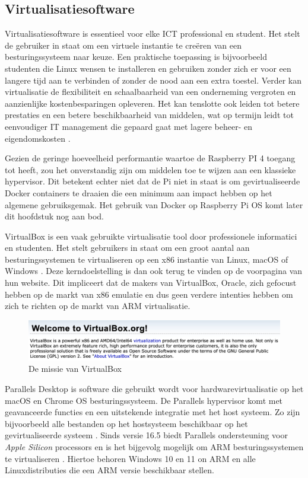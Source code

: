 \subsection{Virtualisatiesoftware}
Virtualisatiesoftware is essentieel voor elke ICT professional en student. Het stelt de gebruiker in staat om een virtuele instantie te creëren van een besturingssysteem naar keuze. Een praktische toepassing is bijvoorbeeld studenten die Linux wensen te installeren en gebruiken zonder zich er voor een langere tijd aan te verbinden of zonder de nood aan een extra toestel. Verder kan virtualisatie de flexibiliteit en schaalbaarheid van een onderneming vergroten en aanzienlijke kostenbesparingen opleveren. Het kan tenslotte ook leiden tot betere prestaties en een betere beschikbaarheid van middelen, wat op termijn leidt tot eenvoudiger IT management die gepaard gaat met lagere beheer- en eigendomskosten \autocite{VMware2016}.

Gezien de geringe hoeveelheid performantie waartoe de Raspberry PI 4 toegang tot heeft, zou het onverstandig zijn om middelen toe te wijzen aan een klassieke hypervisor. Dit betekent echter niet dat de Pi niet in staat is om gevirtualiseerde Docker containers te draaien die een minimum aan impact hebben op het algemene gebruiksgemak. Het gebruik van Docker op Raspberry Pi OS komt later dit hoofdstuk nog aan bod.

VirtualBox is een vaak gebruikte virtualisatie tool door professionele informatici en studenten. Het stelt gebruikers in staat om een groot aantal aan besturingssystemen te virtualiseren op een x86 instantie van Linux, macOS of Windows \autocite{VirtualBox2003}. Deze kerndoelstelling is dan ook terug te vinden op de voorpagina van hun website. Dit impliceert dat de makers van VirtualBox, Oracle, zich gefocust hebben op de markt van x86 emulatie en dus geen verdere intenties hebben om zich te richten op de markt van ARM virtualisatie.

\begin{figure}[!h]
	\centering
	\includegraphics[width=\linewidth]{img/virtualbox.png}
	\caption{De missie van VirtualBox \autocite{VirtualBox2003}}
\end{figure}

Parallels Desktop is software die gebruikt wordt voor hardwarevirtualisatie op het macOS en Chrome OS besturingssysteem. De Parallels hypervisor komt met geavanceerde functies en een uitstekende integratie met het host systeem. Zo zijn bijvoorbeeld alle bestanden op het hostsysteem beschikbaar op het gevirtualiseerde systeem \autocite{Parallels2009}. Sinds versie 16.5 biedt Parallels ondersteuning voor \textit{Apple Silicon} processors en is het bijgevolg mogelijk om ARM besturingssystemen te virtualiseren \autocite{Vogel2021}. Hiertoe behoren Windows 10 en 11 on ARM en alle Linuxdistributies die een ARM versie beschikbaar stellen. 

